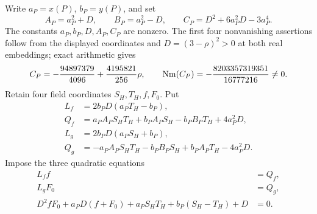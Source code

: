 \documentclass[11pt,a4paper]{article}
\theoremstyle{remark}\newtheorem{remark}[theorem]{Remark}
\begin{document}
Write $a_P=x(P)$, $b_P=y(P)$, and set
\[
 A_P=a_P^2+D,\qquad B_P=a_P^2-D,\qquad
 C_P=D^2+6a_P^2D-3a_P^4.
\]
The constants $a_P,b_P,D,A_P,C_P$ are nonzero. The first four
nonvanishing assertions follow from the displayed coordinates and
$D=(3-\rho)^2>0$ at both real embeddings; exact arithmetic gives
\[
 C_P=-\frac{94897379}{4096}+\frac{4195821}{256}\rho,
 \qquad \operatorname{Nm}(C_P)=-\frac{8203357319351}{16777216}\ne0.
\]
Retain four field coordinates $S_H,T_H,f,F_0$. Put
\begin{align*}
 L_f&=2b_PD(a_PT_H-b_P),\\
 Q_f&=a_PA_P S_H T_H+b_PA_P S_H-b_PB_PT_H+4a_P^2D,\\
 L_g&=2b_PD(a_P S_H+b_P),\\
 Q_g&=-a_PA_P S_H T_H-b_PB_P S_H+b_PA_PT_H-4a_P^2D.
\end{align*}
Impose the three quadratic equations
\begin{equation}\label{eq:Hchart}
 \begin{split}
 L_ff&=Q_f,\\
 L_gF_0&=Q_g,\\
 D^2fF_0+a_PD(f+F_0)+a_PS_HT_H+b_P(S_H-T_H)+D&=0.
 \end{split}
\end{equation}
\end{document}
